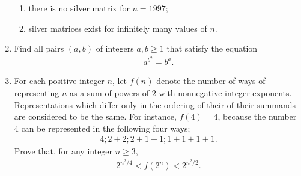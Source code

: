 \documentclass{article}
\begin{document}
\begin{enumerate}
\begin{enumerate}
\item there is no silver matrix for $n=1997$;
\item silver matrices exist for infinitely many values of $n$.
\end{enumerate}
\item Find all pairs $(a,b)$ of integers $a,b \geq 1$ that satisfy the equation 
\begin{align*}
a^{b^2}=b^{a}.
\end{align*}
\item For each positive integer $n$, let $f(n)$ denote the number of ways of representing $n$ as a sum of powers of $2$ with nonnegative integer exponents. Representations which differ only in the ordering of their of their summands are considered to be the same. For instance, $f(4)=4$, because the number $4$ can be represented in the following four ways;
\begin{align*}
4;2 + 2;2 + 1 + 1;1 + 1 + 1 + 1.
\end{align*}
Prove that, for any integer $n \geq{3}$,
\begin{align*}
2^{n^2/4} < f(2^n)<2^{n^2/2}.
\end{align*}
\end{enumerate}
\end{document}
